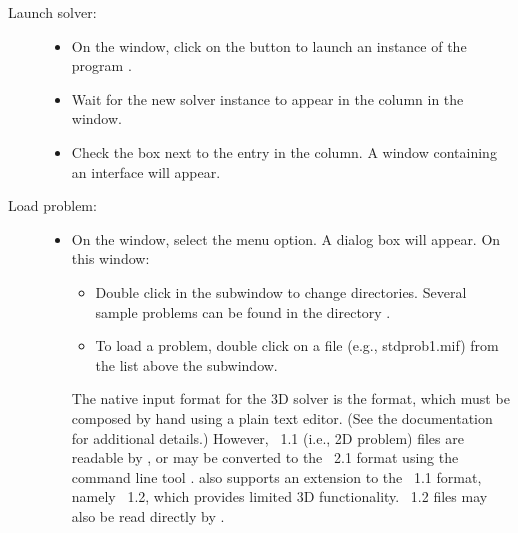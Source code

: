 \begin{list}{}{\setlength{\labelwidth}{0pt}
               \setlength{\leftmargin}{0pt}
               \setlength{\rightmargin}{\leftmargin}
               \setlength{\itemsep}{0pt}}
  \begin{description}
    \item[Launch solver:]\blankspace
    \begin{itemize}
      \item On the  window, click on the 
            button to launch an instance of the program
            .
      \item Wait for the new solver instance to appear in the 
           column in the  window.
      \item Check the box next to the  entry in the
           column.  A window containing an
           interface will appear.
    \end{itemize}
    \item[Load problem:]\blankspace
    \begin{itemize}
      \item On the  window, select the
         menu option.  A 
        dialog box will appear.  On this window:
        \begin{itemize}
          \item Double click in the  subwindow to change
                directories.  Several sample problems can be found in
                the directory .
          \item To load a problem, double click on a  file
                (e.g., stdprob1.mif) from the list above the 
                subwindow.
        \end{itemize}
        The native input format for the 3D solver is the
        format, which must be composed by hand using a plain text
        editor.  (See the  documentation for additional
        details.)  However, \MIF~1.1 (i.e., 2D problem) files are
        readable by , or may be converted to the \MIF~2.1
        format using the command line tool
        .
         also supports an extension to the \MIF~1.1
        format, namely \MIF~1.2, which provides limited 3D
        functionality.  \MIF~1.2 files may also be read directly by
        .

\end{itemize}
\end{description}
\end{list}

